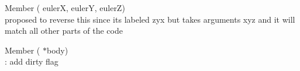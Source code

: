 \begin{DoxyRefList}
\item[Member \doxylink{bt_matrix3x3_8h_a957352e4d1925755ad848d4ddadb540c}{set\+Euler\+ZYX} (\doxylink{bt_scalar_8h_a1e5824cfc8adbf5a77f2622132d16018}{bt\+Scalar} eulerX, \doxylink{bt_scalar_8h_a1e5824cfc8adbf5a77f2622132d16018}{bt\+Scalar} eulerY, \doxylink{bt_scalar_8h_a1e5824cfc8adbf5a77f2622132d16018}{bt\+Scalar} eulerZ)]\hfill \\
\label{todo__todo000041}%
%
proposed to reverse this since it\textquotesingle{}s labeled zyx but takes arguments xyz and it will match all other parts of the code  
\item[Member \doxylink{bt_discrete_dynamics_world_8h_a3056b9b4ecde5ddcbd5d66e2314060aa}{synchronize\+Single\+Motion\+State} (\doxylink{classbt_rigid_body}{bt\+Rigid\+Body} \texorpdfstring{$\ast$}{*}body)]\hfill \\
\label{todo__todo000032}%
%
\+: add \textquotesingle{}dirty\textquotesingle{} flag 
\end{DoxyRefList}